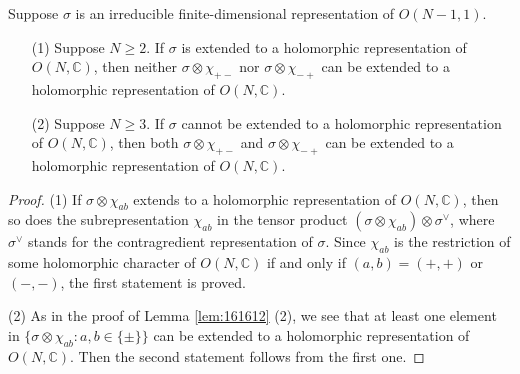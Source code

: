 \begin{lemma}
\label{lem:holoON1}
Suppose $\sigma$ is an irreducible finite-dimensional representation of 
 $O(N-1,1)$.  
\begin{enumerate}
\item[{\rm{(1)}}]
Suppose $N \ge 2$.  
If $\sigma$ is extended to a holomorphic representation
 of $O(N,{\mathbb{C}})$, 
 then neither $\sigma \otimes \chi_{+-}$ nor $\sigma \otimes \chi_{-+}$
 can be extended to a holomorphic representation of $O(N,{\mathbb{C}})$.  
\item[{\rm{(2)}}]
Suppose $N \ge 3$.  
If $\sigma$ cannot be extended to a holomorphic representation
 of $O(N,{\mathbb{C}})$, 
 then both $\sigma \otimes \chi_{+-}$ and $\sigma \otimes \chi_{-+}$
 can be extended to a holomorphic representation of $O(N,{\mathbb{C}})$.  
\end{enumerate}
\end{lemma}

\begin{proof}
(1)\enspace
If $\sigma \otimes \chi_{ab}$ extends to a holomorphic representation
 of $O(N,{\mathbb{C}})$, 
 then so does the subrepresentation $\chi_{ab}$ in the tensor product
 $(\sigma \otimes \chi_{ab}) \otimes \sigma^{\vee}$, 
 where $\sigma^{\vee}$ stands for the contragredient representation of $\sigma$.  
Since $\chi_{ab}$ is the restriction of some holomorphic character of $O(N,{\mathbb{C}})$
 if and only if $(a,b)=(+,+)$ or $(-,-)$, 
 the first statement is proved.  
\par\noindent
(2)\enspace
As in the proof of Lemma \ref{lem:161612} (2), 
 we see that at least one element
 in $\{\sigma \otimes \chi_{ab}:a,b \in \{\pm\}\}$
 can be extended to a holomorphic representation
 of $O(N,{\mathbb{C}})$.  
Then the second statement follows from the first one.  
\end{proof}


